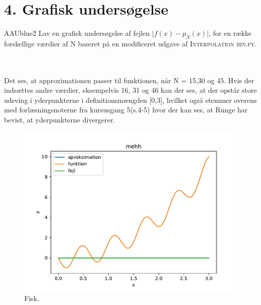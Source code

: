 \section*{4. Grafisk undersøgelse}
%
\begin{color}{AAUblue2} 
Lav en grafisk undersøgelse af fejlen $\lvert f(x)-p_N(x) \rvert$, for en række forskellige værdier af N baseret på en modificeret udgave af \textsc{Interpolation bin.py.}
\end{color}
\\\\
Det ses, at approximationen passer til funktionen, når N = 15,30 og 45. Hvis der indsættes andre værdier, eksempelvis 16, 31 og 46 kan der ses, at der opstår store udsving i yderpunkterne i definitionsmængden [0,3], hvilket også stemmer overens med forlæsningsnoterne fra kursusgang 5(s.4-5) hvor der kan ses, at Runge har bevist, at yderpunkterne divergerer.
%
\begin{figure}[h!]
\begin{center}
\includegraphics[scale=0.9]{code/del2}
\end{center}
\caption{Fisk.}
%
\end{figure} 
